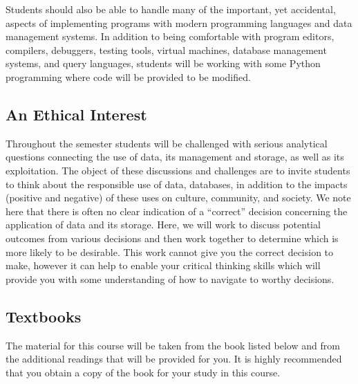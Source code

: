 \documentclass[11pt]{article} %
\begin{document}
\noindent Students should also be able to handle many of the important, yet accidental, aspects of implementing programs with modern programming languages and data management systems.  In addition to being comfortable with program editors, compilers, debuggers, testing tools, virtual machines, database management systems, and query languages, students will be working with some Python programming where code will be provided to be modified.





\subsection*{An Ethical Interest}

Throughout the semester students will be challenged with serious analytical questions connecting the use of data, its management and storage, as well as its exploitation. The object of these discussions and challenges are to invite students to think about the responsible use of data, databases, in addition to the impacts (positive and negative) of these uses on culture, community, and society. We note here that there is often no clear indication of a ``correct'' decision concerning the application of data and its storage. Here, we will work to discuss potential outcomes from various decisions and then work together to determine which is more likely to be desirable. This work cannot give you the correct decision to make, however it can help to enable your critical thinking skills which will provide you with some understanding of how to navigate to worthy decisions.\\


\subsection*{\textbf{Textbooks}}

The material for this course will be taken from the book listed below and from the additional readings that will be provided for you. It is highly recommended that you obtain a copy of the book for your study in this course.
\end{document}
